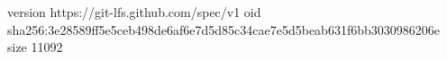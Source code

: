 version https://git-lfs.github.com/spec/v1
oid sha256:3e28589ff5e5ceb498de6af6e7d5d85c34cae7e5d5beab631f6bb3030986206e
size 11092
